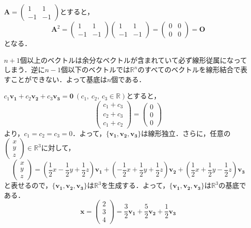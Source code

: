 \begin{ans}
$\bm{A}=\begin{pmatrix} 1 & 1 \\ -1 & -1\end{pmatrix}$とすると，
\[\bm{A}^2=\begin{pmatrix} 1 & 1 \\ -1 & -1\end{pmatrix}\begin{pmatrix} 1 & 1 \\ -1 & -1\end{pmatrix}=\begin{pmatrix} 0 & 0 \\ 0 & 0\end{pmatrix}=\bm{O}\]
となる．
\end{ans}

\begin{ans}
$n+1$個以上のベクトルは余分なベクトルが含まれていて必ず線形従属になってしまう．逆に$n-1$個以下のベクトルでは$\mathbb{R}^n$のすべてのベクトルを線形結合で表すことができない．よって基底は$n$個である．
\end{ans}

\begin{ans}
$c_1\bm{v_1}+c_2\bm{v_2}+c_3\bm{v_3}=\bm{0}\ (c_1,\ c_2,\ c_3\in\mathbb{R})$とすると，
\[
\begin{pmatrix}
	c_1 + c_3\\
	c_2 + c_3\\
	c_1 + c_2
\end{pmatrix}
=
\begin{pmatrix}
	0\\
	0\\
	0
\end{pmatrix}
\]
より，$c_1=c_2=c_3=0$．よって，$\{\bm{v_1},\bm{v_2},\bm{v_3}\}$は線形独立．さらに，任意の$\begin{pmatrix} x\\ y\\ z \end{pmatrix}\in\mathbb{R}^3$に対して，
\[\begin{pmatrix} x\\ y\\ z \end{pmatrix}=\left(\frac{1}{2}x-\frac{1}{2}y+\frac{1}{2}z\right)\bm{v_1}+\left(-\frac{1}{2}x+\frac{1}{2}y+\frac{1}{2}z\right)\bm{v_2}+\left(\frac{1}{2}x+\frac{1}{2}y-\frac{1}{2}z\right)\bm{v_3}\]
と表せるので，$\{\bm{v_1},\bm{v_2},\bm{v_3}\}$は$\mathbb{R}^3$を生成する．よって，$\{\bm{v_1},\bm{v_2},\bm{v_3}\}$は$\mathbb{R}^3$の基底である．
\[
\bm{x}=\begin{pmatrix} 2\\ 3\\ 4 \end{pmatrix}=\frac{3}{2}\bm{v_1}+\frac{5}{2}\bm{v_2}+\frac{1}{2}\bm{v_3}
\]
\end{ans}

